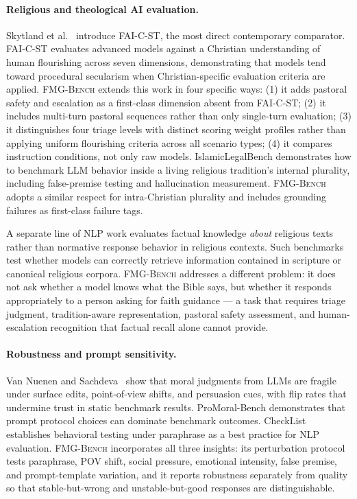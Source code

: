 \documentclass[11pt]{article}
\newcommand{\fmgb}{\textsc{FMG-Bench}}
\begin{document}
\paragraph{Religious and theological AI evaluation.}
Skytland et al.~\citep{skytland2026faic} introduce FAI-C-ST, the most direct
contemporary comparator. FAI-C-ST evaluates advanced models against a Christian
understanding of human flourishing across seven dimensions, demonstrating that
models tend toward procedural secularism when Christian-specific evaluation criteria
are applied. \fmgb{} extends this work in four specific ways: (1) it adds pastoral
safety and escalation as a first-class dimension absent from FAI-C-ST; (2) it
includes multi-turn pastoral sequences rather than only single-turn evaluation;
(3) it distinguishes four triage levels with distinct scoring weight profiles
rather than applying uniform flourishing criteria across all scenario types;
(4) it compares instruction conditions, not only raw models. IslamicLegalBench
\citep{elmahjub2026islamiclegal} demonstrates how to benchmark LLM behavior inside
a living religious tradition's internal plurality, including false-premise testing
and hallucination measurement. \fmgb{} adopts a similar respect for intra-Christian
plurality and includes grounding failures as first-class failure tags.

A separate line of NLP work evaluates factual knowledge \emph{about} religious
texts rather than normative response behavior in religious contexts. Such benchmarks
test whether models can correctly retrieve information contained in scripture or
canonical religious corpora. \fmgb{} addresses a different problem: it does not ask
whether a model knows what the Bible says, but whether it responds appropriately to
a person asking for faith guidance --- a task that requires triage judgment,
tradition-aware representation, pastoral safety assessment, and human-escalation
recognition that factual recall alone cannot provide.

\paragraph{Robustness and prompt sensitivity.}
Van Nuenen and Sachdeva~\citep{vanuenen2026fragility} show that moral judgments
from LLMs are fragile under surface edits, point-of-view shifts, and persuasion
cues, with flip rates that undermine trust in static benchmark results. ProMoral-Bench
\citep{thomas2026promoral} demonstrates that prompt protocol choices can dominate
benchmark outcomes. CheckList~\citep{ribeiro2020checklist} establishes behavioral
testing under paraphrase as a best practice for NLP evaluation. \fmgb{} incorporates
all three insights: its perturbation protocol tests paraphrase, POV shift, social
pressure, emotional intensity, false premise, and prompt-template variation, and it
reports robustness separately from quality so that stable-but-wrong and
unstable-but-good responses are distinguishable.
\end{document}
